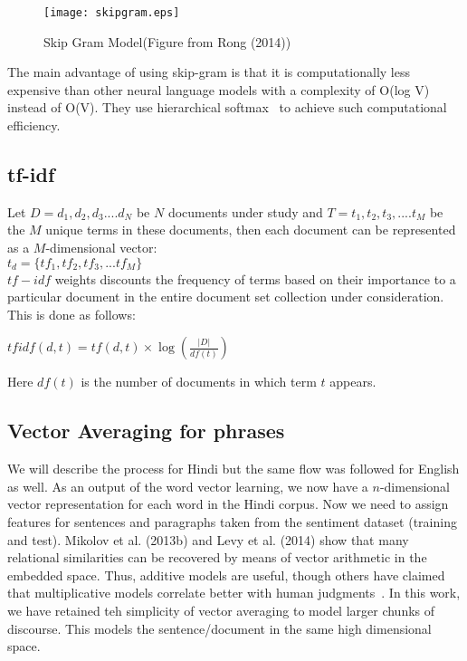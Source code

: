\begin{figure}[ht!]
\centering
\texttt{[image: skipgram.eps]}
\caption{Skip Gram Model(Figure from Rong (2014)) \label{fig:skipgram}}
\end{figure}
The main advantage of using skip-gram is that it is computationally less expensive than other neural language models with a complexity of O(log V) instead of O(V). They use hierarchical softmax~\cite{Morin:05} to achieve such computational efficiency.

\subsection{tf-idf}
\label{subsec:tfidf}
Let $D=d_1, d_2, d_3....d_N$ be $N$ documents under study and $T=t_1, t_2, t_3,....t_M$ be the $M$ unique terms in these documents, then each document can be represented as a $M$-dimensional vector:\\
$t_d=\{tf_1,tf_2,tf_3,...tf_M\}$\\
$tf-idf$ weights discounts the frequency of terms based on their importance to a particular document in the entire document set collection under consideration. This is done as follows:
\begin{center}
$tfidf(d,t)=tf(d,t) \times \log(\frac{|D|}{df(t)})$ 
\end{center}
Here $df(t)$ is the number of documents in which term $t$ appears.

\subsection{Vector Averaging for phrases}
\label{sec:vectoraveraging}
We will describe the process for Hindi but the same flow was followed for English as well.
As an output of the word vector learning, we now have a $n$-dimensional
vector representation for each word in the Hindi corpus.  Now we need to
assign features for sentences and paragraphs taken from the sentiment dataset
(training and test).  Mikolov et al. (2013b) and Levy et al. (2014) show that
many relational similarities can be recovered by means of vector arithmetic
in the embedded space.  Thus, additive models are useful, though
others have claimed that multiplicative models correlate better with human
judgments~\cite{Mitchell:08,Socher:13}.  In this work, we have retained teh
simplicity of vector averaging to model larger chunks of  discourse.
This models the sentence/document in the same high dimensional space.


